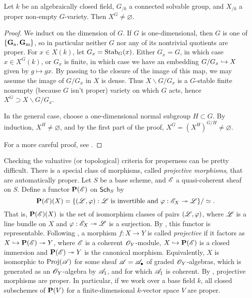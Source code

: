 \begin{theorem}\label{thm:borel-fixed}
Let $k$ be an algebraically closed field, $G_{/k}$ a connected solvable group, 
and $X_{/k}$ a proper non-empty $G$-variety. Then $X^G\ne\varnothing$. 
\end{theorem}
\begin{proof}
We induct on the dimension of $G$. If $G$ is one-dimensional, then 
$G$ is one of $\{\mathbf{G}_\mathrm{a},\mathbf{G}_\mathrm{m}\}$, so in particular neither $G$ nor any of its 
nontrivial quotients are proper. For $x\in X(k)$, let 
$G_x=\operatorname{Stab}_G(x)$. Either $G_x=G$, in which case $x\in X^G(k)$, or 
$G_x$ is finite, in which case we have an embedding $G/G_x\hookrightarrow X$ given 
by $g\mapsto g x$. By passing to the closure of the image of this map, 
we may assume the image of $G/G_x$ in $X$ is dense. Thus 
$X\smallsetminus G/G_x$ is a $G$-stable finite nonempty (because $G$ 
isn't proper) variety on which $G$ acts, hence 
$X^G\supset X\smallsetminus G/G_x$. 

In the general case, choose a one-dimensional normal subgroup 
$H\subset G$. By induction, $X^H\ne\varnothing$, and by the first part of 
the proof, $X^G=(X^H)^{G/H}\ne\varnothing$. 

For a more careful proof, see \cite[18.1]{milne-iAG}. 
\end{proof}

Checking the valuative (or topological) criteria for properness can be pretty 
difficult. There is a special class of morphisms, called \emph{projective 
morphisms}, that are automatically proper. Let $S$ be a base scheme, and 
$\mathscr{E}$ a quasi-coherent sheaf on $S$. Define a functor $\mathbf{P}(\mathscr{E})$ on 
$\mathsf{Sch}_{S}$ by 
\[
  \mathbf{P}(\mathscr{E})(X) = \{(\mathscr{L},\varphi):\text{$\mathscr{L}$ is invertible and }\varphi:\mathscr{E}_X\twoheadrightarrow \mathscr{L}\} /\simeq .
\]
That is, $\mathbf{P}(\mathscr{E})(X)$ is the set of isomorphism classes of pairs 
$(\mathscr{L},\varphi)$, where $\mathscr{L}$ is a line bundle on $X$ and 
$\varphi:\mathscr{E}_X\twoheadrightarrow \mathscr{L}$ is a surjection. By \cite[II 4.2.3]{ega2}, this 
functor is representable. Following \cite[II 5.5.2]{ega2}, a morphism 
$f:X\to Y$ is called \emph{projective} if it factors as 
$X\hookrightarrow \mathbf{P}(\mathscr{E})\twoheadrightarrow Y$, where $\mathscr{E}$ is a coherent $\mathscr{O}_Y$-module, 
$X\hookrightarrow \mathbf{P}(\mathscr{E})$ is a closed immersion and $\mathbf{P}(\mathscr{E})\twoheadrightarrow Y$ is the 
canonical morphism. Equivalently, $X$ is isomorphic to $\operatorname{Proj}(\mathscr{A})$ for 
some sheaf $\mathscr{A}=\mathscr{A}_\bullet$ of graded $\mathscr{O}_Y$-algebras, which is 
generated as an $\mathscr{O}_Y$-algebra by $\mathscr{A}_1$, and for which $\mathscr{A}_1$ is coherent. 
By \cite[II 5.5.3]{ega2}, projective morphisms are proper. In particular, 
if we work over a base field $k$, all closed subschemes of 
$\mathbf{P}(V)$ for a finite-dimensional $k$-vector space $V$ are proper. 



